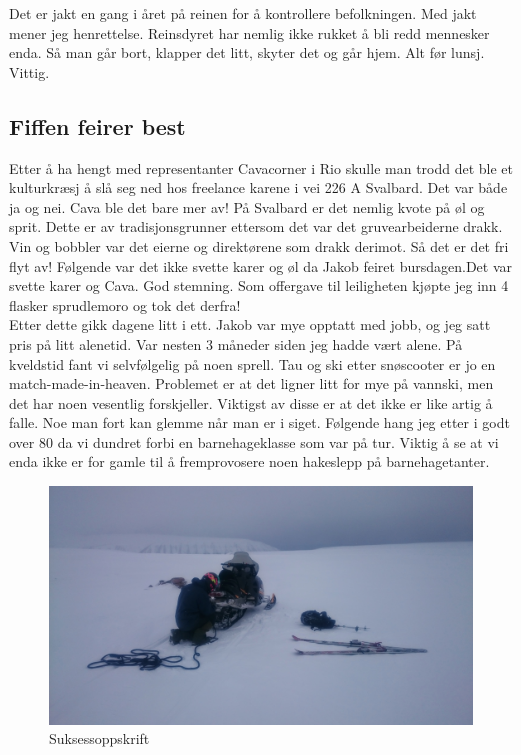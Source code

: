 Det er jakt en gang i året på reinen for å kontrollere befolkningen.
Med jakt mener jeg henrettelse. Reinsdyret har nemlig ikke rukket å
bli redd mennesker enda. Så man går bort, klapper det litt, skyter det
og går hjem. Alt før lunsj. Vittig.





\subsection{Fiffen feirer best}

Etter å ha hengt med representanter Cavacorner i Rio skulle man trodd
det ble et kulturkræsj å slå seg ned hos freelance karene i vei 226 A
Svalbard. Det var både ja og nei. Cava ble det bare mer av! På
Svalbard er det nemlig kvote på øl og sprit. Dette er av
tradisjonsgrunner ettersom det var det gruvearbeiderne drakk. Vin og
bobbler var det eierne og direktørene som drakk derimot. Så det er det
fri flyt av! Følgende var det ikke svette karer og øl da Jakob feiret
bursdagen.Det var svette karer og Cava. God stemning. Som offergave
til leiligheten kjøpte jeg inn 4 flasker sprudlemoro og tok det
derfra!\\


Etter dette gikk dagene litt i ett. Jakob var mye opptatt med jobb, og
jeg satt pris på litt alenetid. Var nesten 3 måneder siden jeg hadde
vært alene. På kveldstid fant vi selvfølgelig på noen sprell. Tau og
ski etter snøscooter er jo en match-made-in-heaven. Problemet er at
det ligner litt for mye på vannski, men det har noen vesentlig
forskjeller. Viktigst av disse er at det  ikke er like
artig å falle. Noe man fort kan glemme når man er i siget. Følgende
hang jeg etter i godt over 80 da vi dundret forbi en
barnehageklasse som var på tur. Viktig å se at vi enda ikke er for
gamle til å fremprovosere noen hakeslepp på barnehagetanter.\\
\begin{figure}[]
	\centering
	\includegraphics[width=\textwidth]{Scooterogski}
	\caption*{Suksessoppskrift}
\label{fig:trollsteinen}
\end{figure}


